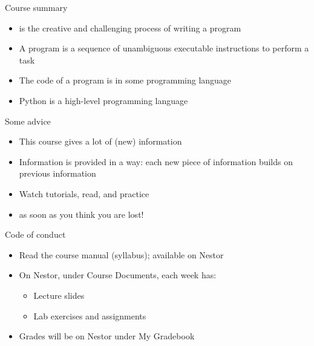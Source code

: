 \documentclass[aspectratio=169,usenames,dvipsnames]{beamer}
\begin{document}

\begin{frame}{Course summary}
    \begin{itemize}
        \item {} is the creative and challenging process
            of writing a program
        \item A program is a sequence of unambiguous executable
            instructions to perform a task
        \item The code of a program is in some programming language
        \item Python is a high-level programming language
    \end{itemize}
\end{frame}

\begin{frame}{Some advice}
    \begin{itemize}
        \item This course gives a lot of (new) information
        \item Information is provided in a  way:
            each new piece of information builds on previous information
        \item Watch tutorials, read, and practice
        \item {} as soon as you think you are lost!
    \end{itemize}
\end{frame}

\begin{frame}{Code of conduct}
    \begin{itemize}
        \item Read the course manual (syllabus); available on Nestor
        \item On Nestor, under Course Documents, each week has:
            \begin{itemize}
                \item Lecture slides
                \item Lab exercises and assignments
            \end{itemize}
        \item Grades will be on Nestor under My Gradebook
    \end{itemize}
\end{frame}
\end{document}
